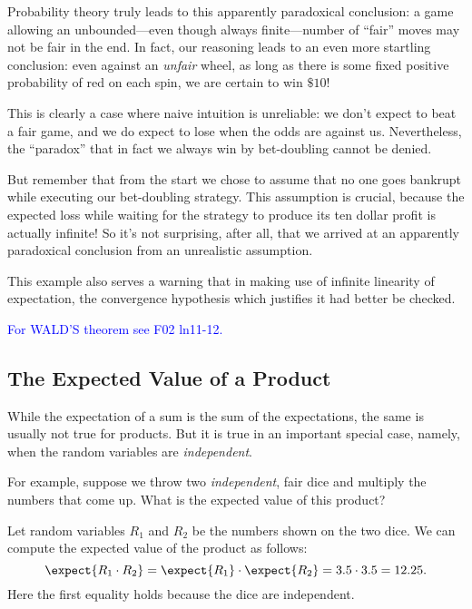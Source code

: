 \begin{editingnotes}
Probability theory truly leads to this apparently paradoxical conclusion: a
game allowing an unbounded---even though always finite---number of ``fair''
moves may not be fair in the end.  In fact, our reasoning leads to an even
more startling conclusion: even against an \emph{unfair} wheel, as long as
there is some fixed positive probability of red on each spin, we are
certain to win $\$10$!

This is clearly a case where naive intuition is unreliable: we don't
expect to beat a fair game, and we do expect to lose when the odds are
against us.  Nevertheless, the ``paradox'' that in fact we always win by
bet-doubling cannot be denied.

But remember that from the start we chose to assume that no one goes
bankrupt while executing our bet-doubling strategy.  This assumption is
crucial, because the expected loss while waiting for the strategy to
produce its ten dollar profit is actually infinite!  So it's not
surprising, after all, that we arrived at an apparently paradoxical
conclusion from an unrealistic assumption.

This example also serves a warning that in making use of infinite
linearity of expectation, the convergence hypothesis which justifies it
had better be checked.

\textcolor{blue}{For WALD'S theorem see F02 ln11-12.}

\end{editingnotes}

\subsection{The Expected Value of a Product}

While the expectation of a sum is the sum of the expectations, the same is
usually not true for products.  But it is true in an important special
case, namely, when the random variables are \emph{independent}.

For example, suppose we throw two \emph{independent}, fair dice and
multiply the numbers that come up.  What is the expected value of this
product?

Let random variables $R_1$ and $R_2$ be the numbers shown on the two
dice.  We can compute the expected value of the product as follows:
\begin{equation}\label{R1R2}
  \expect{R_1 \cdot R_2}
  = \expect{R_1} \cdot \expect{R_2}
  = 3.5 \cdot 3.5
  = 12.25.
\end{equation}
Here the first equality holds because the dice are independent.

